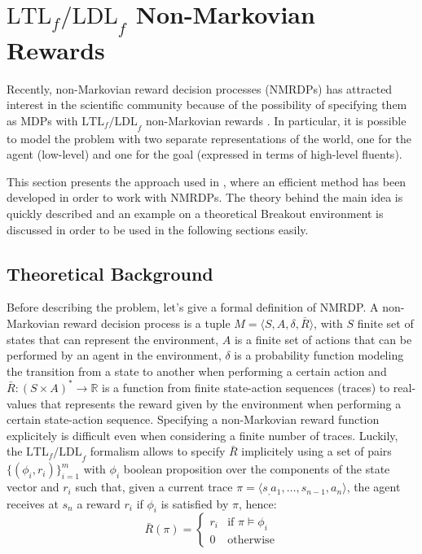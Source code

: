 \section{$\text{LTL}_f\text{/LDL}_f$ Non-Markovian Rewards}
\label{section:nonmarkovianrewards}
Recently, non-Markovian reward decision processes (NMRDPs)
has attracted interest in the scientific community because of the possibility
of specifying them as MDPs with $\text{LTL}_f\text{/LDL}_f$ non-Markovian
rewards \cite{DBLP:journals/corr/abs-1807-06333}. In particular, it is possible
to model the problem with two separate representations of the world, one for
the agent (low-level) and one for the goal (expressed in terms of high-level
fluents).

This section presents the approach used in
\cite{DBLP:journals/corr/abs-1807-06333}, where an efficient method has been
developed in order to work with NMRDPs. The theory behind the main idea is
quickly described and an example on a theoretical Breakout environment is
discussed in order to be used in the following sections easily.

\subsection{Theoretical Background}
Before describing the problem, let's give a formal definition of NMRDP.
A non-Markovian reward decision process is a tuple $M = \langle S, A, \delta,
\bar{R} \rangle$, with $S$ finite set of states that can represent the
environment, $A$ is a finite set of actions that can be performed by an agent
in the environment, $\delta$ is a probability function modeling
the transition from a state to another when performing a certain action and
$\bar{R}: (S \times A)^* \rightarrow \mathbb{R}$ is a function from
finite state-action sequences (traces) to real-values that represents the
reward given by the environment when performing a certain state-action
sequence. Specifying a non-Markovian reward function explicitely is
difficult even when considering a finite number of traces. Luckily, the
$\text{LTL}_f\text{/LDL}_f$ formalism allows to specify $\bar{R}$
implicitely using a set of pairs $\{ (\phi_i, r_i) \}_{i=1}^m$ with
$\phi_i$ boolean
proposition over the components of the state vector and $r_i$ such that,
given a current trace $\pi = \langle s_, a_1, \dots, s_{n-1}, a_n \rangle$,
the agent receives at $s_n$ a reward $r_i$ if $\phi_i$ is satisfied by $\pi$,
hence:
\begin{equation}
    \bar{R}(\pi) =
        \begin{cases}
            r_i & \text{if } \pi \vDash \phi_i \\
            0 & \text{otherwise}
        \end{cases}
\end{equation}

